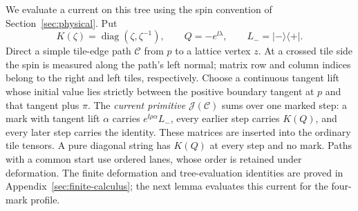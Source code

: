 We evaluate a current on this tree using the spin convention of
Section~\ref{sec:physical}.  Put
\[
 K(\zeta)=\operatorname{diag}(\zeta,\zeta^{-1}),\qquad
 Q=-e^{\ii\lambda},\qquad L_-=|-\rangle\langle+|.
\]
Direct a simple tile-edge path $\mathcal C$ from $p$ to a lattice
vertex $z$.  At a crossed tile side the spin is measured along the
path's left normal; matrix row and column indices belong to the right
and left tiles, respectively.  Choose a continuous tangent lift whose
initial value lies strictly between the positive boundary tangent at $p$ and
that tangent plus $\pi$.  The \emph{current primitive}
$\mathcal J(\mathcal C)$ sums over one marked step: a mark with tangent
lift $\alpha$ carries $e^{\ii\rho\alpha}L_-$, every earlier step carries
$K(Q)$, and every later step carries the identity.  These matrices are
inserted into the ordinary tile tensors.  A pure diagonal string has
$K(Q)$ at every step and no mark.  Paths with a common start use ordered
lanes, whose order is retained under deformation.  The finite
deformation and tree-evaluation identities are proved in
Appendix~\ref{sec:finite-calculus}; the next lemma evaluates this
current for the four-mark profile.

